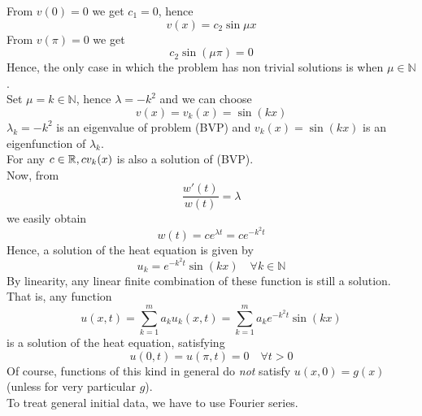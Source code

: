 \begin{enumerate}
\begin{itemize}
\begin{equation*}
        \end{equation*}
        From $v(0)= 0$ we get $c_1=0$, hence
        \begin{equation*}
            v(x) = c_2 \sin \mu x 
        \end{equation*}
        From $v(\pi) = 0$ we get 
        \begin{equation*}
            c_2 \sin(\mu \pi) = 0
        \end{equation*}
        Hence, the only case in which the problem has non trivial solutions is when $\mu \in \mathbb{N}$. \\
        Set $\mu = k \in \mathbb{N}$, hence $\lambda = -k^2$ and we can choose 
        \begin{equation*}
            v(x) = v_k(x)=\sin(kx)
        \end{equation*}
        $\lambda_k=-k^2$ is an eigenvalue of problem (BVP) and $v_k(x) = \sin(kx)$ is an eigenfunction of $\lambda_k$. \\
        For any $c \in \mathbb{R}, c v_k(x)$ is also a solution of (BVP). \\
        Now, from 
        \begin{equation*}
            \frac{w'(t)}{w(t)}=\lambda
        \end{equation*}
        we easily obtain
        \begin{equation*}
            w(t) = ce^{\lambda t} = c e^{-k^2 t}
        \end{equation*}
        Hence, a solution of the heat equation is given by
        \begin{equation*}
            u_k=e^{-k^2 t} \sin(kx) \quad \forall k \in \mathbb{N}
        \end{equation*}
        By linearity, any linear finite combination of these function is still a solution. That is, any function
        \begin{equation*}
            u(x,t) = \sum_{k=1}^m a_k u_k(x,t) = \sum_{k=1}^m a_k e^{-k^2 t} \sin(kx)
        \end{equation*}
        is a solution of the heat equation, satisfying 
        \begin{equation*}
            u(0,t) = u(\pi,t) = 0 \quad \forall t > 0
        \end{equation*}
        Of course, functions of this kind in general do \emph{not} satisfy $u(x,0)=g(x)$ (unless for very particular $g$). \\
        To treat general initial data, we have to use Fourier series. \\

\end{itemize}
\end{enumerate}
